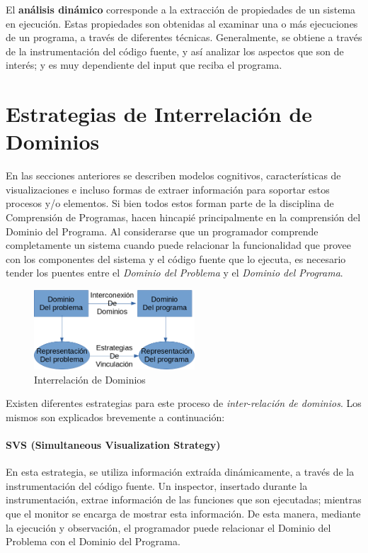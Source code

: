 El \textbf{análisis dinámico} corresponde a la extracción de propiedades de un sistema
en ejecución.
Estas propiedades son obtenidas al examinar una o más ejecuciones de un programa, a
través de diferentes técnicas.
Generalmente, se obtiene a través de la instrumentación del código fuente, y así
analizar los aspectos que son de interés; y es muy dependiente del input que reciba
el programa.
\cite{Ball90}

\section{Estrategias de Interrelación de Dominios}

En las secciones anteriores se describen modelos cognitivos, características de
visualizaciones e incluso formas de extraer información para soportar estos 
procesos y/o elementos.
Si bien todos estos forman parte de la disciplina de Comprensión de Programas, hacen
hincapié principalmente en la comprensión del Dominio del Programa.
Al considerarse que un programador comprende completamente un sistema cuando puede
relacionar la funcionalidad que provee con los componentes del sistema y el código
fuente que lo ejecuta, es necesario tender los puentes entre el \textit{Dominio del Problema}
y el \textit{Dominio del Programa}.

\begin{figure}[H]
    \includegraphics[width=6cm]{program_comprehension/domains.png}
    \centering
    \caption{Interrelación de Dominios}
\end{figure}

Existen diferentes estrategias\cite{BeronOliveiraCruz10} para este proceso de 
\textit{inter-relación de dominios}.
Los mismos son explicados brevemente a continuación:

\paragraph{SVS (Simultaneous Visualization Strategy)}
En esta estrategia, se utiliza información extraída dinámicamente, a través de
la instrumentación del código fuente.
Un inspector, insertado durante la instrumentación, extrae información de las funciones 
que son ejecutadas; mientras que el monitor se encarga de mostrar esta información.
De esta manera, mediante la ejecución y observación, el programador puede relacionar
el Dominio del Problema con el Dominio del Programa. 

